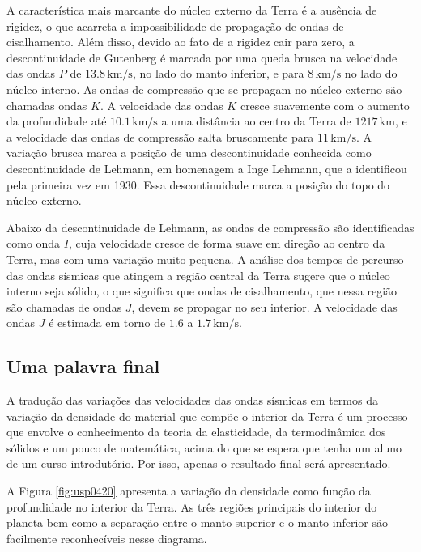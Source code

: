 \documentclass[]{book}
\theoremstyle{definition}
\theoremstyle{definition}
\theoremstyle{definition}
\theoremstyle{remark}
\begin{document}
A característica mais marcante do núcleo externo da Terra é a ausência de rigidez, o que acarreta a impossibilidade de propagação de ondas de cisalhamento. Além disso, devido ao fato de a rigidez cair para zero, a descontinuidade de Gutenberg é marcada por uma queda brusca na velocidade das ondas \(P\) de \(13.8\,\mathrm{km/s}\), no lado do manto inferior, e para \(8\,\mathrm{km/s}\) no lado do núcleo interno. As ondas de compressão que se propagam no núcleo externo são chamadas ondas \(K\). A velocidade das ondas \(K\) cresce suavemente com o aumento da profundidade até \(10.1\,\mathrm{km/s}\) a uma distância ao centro da Terra de \(1217\,\mathrm{km}\), e a velocidade das ondas de compressão salta bruscamente para \(11\,\mathrm{km/s}\). A variação brusca marca a posição de uma descontinuidade conhecida como descontinuidade de Lehmann, em homenagem a Inge Lehmann, que a identificou pela primeira vez em 1930. Essa descontinuidade marca a posição do topo do núcleo externo.

Abaixo da descontinuidade de Lehmann, as ondas de compressão são identificadas como onda \(I\), cuja velocidade cresce de forma suave em direção ao centro da Terra, mas com uma variação muito pequena. A análise dos tempos de percurso das ondas sísmicas que atingem a região central da Terra sugere que o núcleo interno seja sólido, o que significa que ondas de cisalhamento, que nessa região são chamadas de ondas \(J\), devem se propagar no seu interior. A velocidade das ondas \(J\) é estimada em torno de \(1.6\) a \(1.7\,\mathrm{km/s}\).

\hypertarget{uma-palavra-final}{%
\subsection{Uma palavra final}\label{uma-palavra-final}}

A tradução das variações das velocidades das ondas sísmicas em termos da variação da densidade do material que compõe o interior da Terra é um processo que envolve o conhecimento da teoria da elasticidade, da termodinâmica dos sólidos e um pouco de matemática, acima do que se espera que tenha um aluno de um curso introdutório. Por isso, apenas o resultado final será apresentado.

A Figura \ref{fig:usp0420} apresenta a variação da densidade como função da profundidade no interior da Terra. As três regiões principais do interior do planeta bem como a separação entre o manto superior e o manto inferior são facilmente reconhecíveis nesse diagrama.
\end{document}
